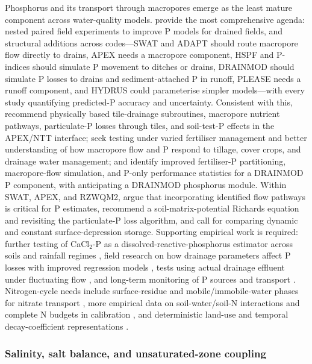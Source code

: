 Phosphorus and its transport through macropores emerge as the least mature
component across water-quality models. \textcite{Radcliffe2015} provide the most
comprehensive agenda: nested paired field experiments to improve P models for
drained fields, and structural additions across codes---SWAT and ADAPT should
route macropore flow directly to drains, APEX needs a macropore component, HSPF
and P-indices should simulate P movement to ditches or drains, DRAINMOD should
simulate P losses to drains and sediment-attached P in runoff, PLEASE needs a
runoff component, and HYDRUS could parameterise simpler models---with every
study quantifying predicted-P accuracy and uncertainty. Consistent with this,
\textcite{Guo2020b} recommend physically based tile-drainage subroutines,
macropore nutrient pathways, particulate-P losses through tiles, and
soil-test-P effects in the APEX/NTT interface; \textcite{Ford2017} seek testing
under varied fertiliser management and better understanding of how macropore
flow and P respond to tillage, cover crops, and drainage water management; and
\textcite{BinShokrana2023b} identify improved fertiliser-P partitioning,
macropore-flow simulation, and P-only performance statistics for a DRAINMOD P
component, with \textcite{Gowda2012} anticipating a DRAINMOD phosphorus module.
Within SWAT, APEX, and RZWQM2, \textcite{Williams2016} argue that incorporating
identified flow pathways is critical for P estimates, \textcite{Qi2018}
recommend a soil-matrix-potential Richards equation and revisiting the
particulate-P loss algorithm, and \textcite{Moriasi2012} call for comparing
dynamic and constant surface-depression storage. Supporting empirical work is
required: further testing of CaCl$_2$-P as a dissolved-reactive-phosphorus
estimator across soils and rainfall regimes \parencite{McDowell2001b}, field
research on how drainage parameters affect P losses with improved regression
models \parencite{Morrison2013}, tests using actual drainage effluent under
fluctuating flow \parencite{Sanford2016}, and long-term monitoring of P sources
and transport \parencite{Jia2012}. Nitrogen-cycle needs include surface-residue
and mobile/immobile-water phases for nitrate transport \parencite{Malone2017},
more empirical data on soil-water/soil-N interactions and complete N budgets in
calibration \parencite{Gillette2018}, and deterministic land-use and temporal
decay-coefficient representations \parencite{Rudra2005}.

\subsubsection{Salinity, salt balance, and unsaturated-zone coupling}

